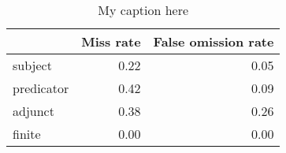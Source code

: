 \begin{table}[!ht]
\centering
\begin{tabular}{lrr}
\toprule
{} &  Miss rate &  False omission rate \\
\midrule
subject    &       0.22 &                 0.05 \\
predicator &       0.42 &                 0.09 \\
adjunct    &       0.38 &                 0.26 \\
finite     &       0.00 &                 0.00 \\
\bottomrule
\end{tabular}
\caption{My caption here}
\label{tab:unit-elements-mood-combined-errors}
\end{table}